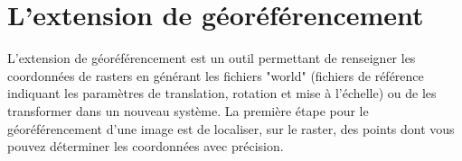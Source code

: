 
\section{L'extension de géoréférencement}


L'extension de géoréférencement est un outil permettant de renseigner les coordonnées de rasters en générant les fichiers "world" (fichiers de référence indiquant les paramètres de translation, rotation et mise à l'échelle) ou de les transformer dans un nouveau système. La première étape pour le géoréférencement d'une image est de localiser, sur le raster, des points dont vous pouvez déterminer les coordonnées avec précision.



